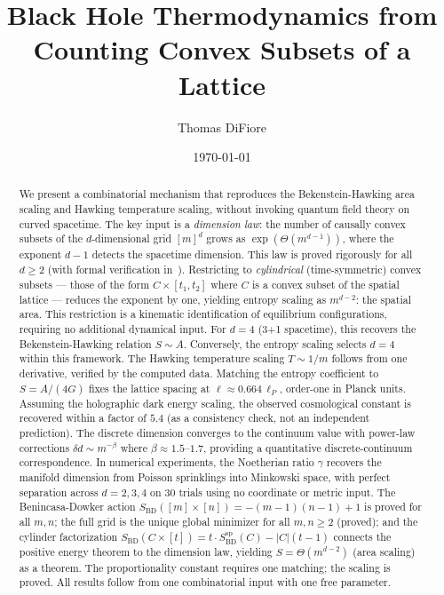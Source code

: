 \documentclass[aps,prl,twocolumn,superscriptaddress]{revtex4-2}
\begin{document}
\title{Black Hole Thermodynamics from Counting Convex Subsets of a Lattice}

\author{Thomas DiFiore}

\date{\today}

\begin{abstract}
We present a combinatorial mechanism that reproduces the
Bekenstein-Hawking area scaling and Hawking temperature scaling,
without invoking quantum field
theory on curved spacetime. The key
input is a
\emph{dimension law}: the number of causally convex subsets of the
$d$-dimensional grid $[m]^d$ grows as $\exp(\Theta(m^{d-1}))$,
where the exponent $d-1$ detects the spacetime dimension. This law is
proved rigorously for all $d \geq 2$ (with formal verification
in~\cite{DiFiorePaper2}). Restricting to \emph{cylindrical}
(time-symmetric) convex subsets --- those of the form
$C \times [t_1, t_2]$ where $C$ is a convex subset of the spatial
lattice --- reduces the exponent by one, yielding entropy scaling as
$m^{d-2}$: the spatial area. This restriction is a kinematic
identification of equilibrium configurations, requiring no additional dynamical
input. For $d=4$ (3+1 spacetime), this recovers
the Bekenstein-Hawking relation $S \sim A$. Conversely,
the entropy scaling selects $d = 4$ within this framework. The Hawking temperature scaling
$T \sim 1/m$ follows from one derivative, verified by the computed
data. Matching the entropy coefficient to $S = A/(4G)$ fixes the
lattice spacing at $\ell \approx 0.664\,\ell_P$, order-one in Planck
units. Assuming the holographic dark energy scaling, the observed
cosmological constant is recovered within a factor of $5.4$
(as a consistency check, not an independent prediction). The discrete dimension converges to the continuum
value with power-law corrections $\delta d \sim m^{-\beta}$ where
$\beta \approx 1.5$--$1.7$, providing a quantitative
discrete-continuum correspondence. In numerical experiments, the
Noetherian ratio $\gamma$ recovers the manifold dimension from Poisson
sprinklings into Minkowski space, with perfect separation across
$d = 2, 3, 4$ on 30 trials using no coordinate or metric input. The Benincasa-Dowker
action $S_{\mathrm{BD}}([m] \times [n]) = -(m-1)(n-1)+1$ is proved
for all $m, n$; the full grid is the unique global minimizer for all
$m, n \geq 2$ (proved); and the cylinder factorization
$S_{\mathrm{BD}}(C \times [t]) = t \cdot S_{\mathrm{BD}}^{\mathrm{sp}}(C) - |C|(t-1)$
connects the positive energy theorem to the dimension law, yielding
$S = \Theta(m^{d-2})$ (area scaling) as a theorem. The proportionality
constant requires one matching; the scaling is proved. All results follow from one combinatorial
input with one free parameter.
\end{abstract}
\end{document}
